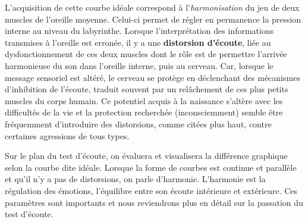                

L'acquisition de cette courbe idéale correspond à l'\textsl{harmonisation}
du jeu de deux muscles de l'oreille moyenne. Celui-ci 
permet de régler en permanence la pression interne au niveau du
labyrinthe.
Lorsque l'interprétation des informations transmises à l'oreille est
erronée, il y a une 
\textbf{distorsion d'écoute}, liée au dysfonctionnement
de ces deux muscles dont le rôle est de permettre l'arrivée
harmonieuse du son dans l'oreille interne, puis au cerveau. Car, lorsque
le message sensoriel est altéré, le cerveau se protège en déclenchant
des mécanismes d'inhibition de l'écoute, traduit souvent par un relâchement de
ces plus petits muscles du corps humain. Ce potentiel acquis à
la naissance s'altère avec les difficultés
de la vie et la protection recherchée (inconsciemment) semble être
fréquemment d'introduire des distorsions, comme citées plus haut,
contre certaines agressions de tous types. 

Sur le plan du test d'écoute, on évaluera et visualisera la différence
graphique selon la courbe dite 
idéale. Lorsque la forme de
courbes est continue et parallèle et qu'il n'y a pas de distorsions, on parle d'harmonie. L'harmonie
est la régulation des émotions, l'équilibre entre son écoute
intérieure et extérieure.
Ces paramètres sont importants et nous reviendrons plus en détail sur
la passation du test d'écoute.




  




 




  

